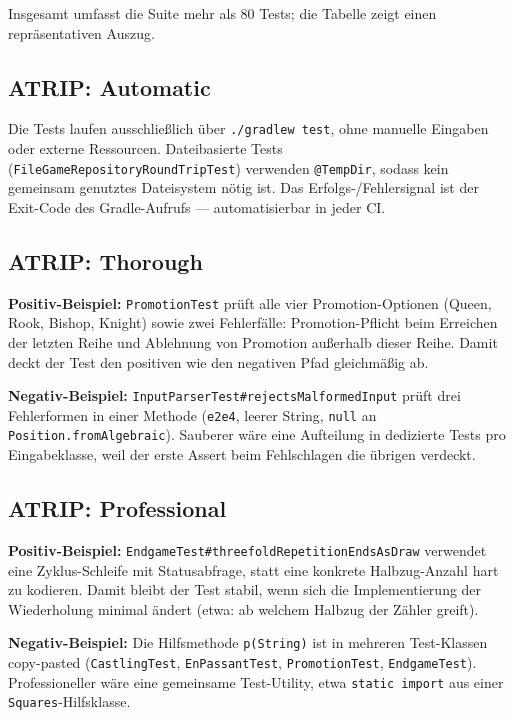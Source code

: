 \documentclass[a4paper,12pt]{article}
\begin{document}
Insgesamt umfasst die Suite mehr als 80 Tests; die Tabelle zeigt einen repräsentativen Auszug.

\bigskip

\subsection*{ATRIP: Automatic}

Die Tests laufen ausschließlich über \texttt{./gradlew test}, ohne manuelle Eingaben oder externe
Ressourcen. Dateibasierte Tests (\texttt{FileGameRepositoryRoundTripTest}) verwenden
\texttt{@TempDir}, sodass kein gemeinsam genutztes Dateisystem nötig ist. Das Erfolgs-/Fehlersignal
ist der Exit-Code des Gradle-Aufrufs --- automatisierbar in jeder CI.

\subsection*{ATRIP: Thorough}

\textbf{Positiv-Beispiel:} \texttt{PromotionTest} prüft alle vier Promotion-Optionen (Queen, Rook,
Bishop, Knight) sowie zwei Fehlerfälle: Promotion-Pflicht beim Erreichen der letzten Reihe und
Ablehnung von Promotion außerhalb dieser Reihe. Damit deckt der Test den positiven wie den
negativen Pfad gleichmäßig ab.

\textbf{Negativ-Beispiel:} \texttt{InputParserTest\#rejectsMalformedInput} prüft drei Fehlerformen
in einer Methode (\texttt{e2e4}, leerer String, \texttt{null} an \texttt{Position.fromAlgebraic}).
Sauberer wäre eine Aufteilung in dedizierte Tests pro Eingabeklasse, weil der erste Assert beim
Fehlschlagen die übrigen verdeckt.

\subsection*{ATRIP: Professional}

\textbf{Positiv-Beispiel:} \texttt{EndgameTest\#threefoldRepetitionEndsAsDraw} verwendet eine
Zyklus-Schleife mit Statusabfrage, statt eine konkrete Halbzug-Anzahl hart zu kodieren. Damit
bleibt der Test stabil, wenn sich die Implementierung der Wiederholung minimal ändert (etwa: ab
welchem Halbzug der Zähler greift).

\textbf{Negativ-Beispiel:} Die Hilfsmethode \texttt{p(String)} ist in mehreren Test-Klassen
copy-pasted (\texttt{CastlingTest}, \texttt{EnPassantTest}, \texttt{PromotionTest},
\texttt{EndgameTest}). Professioneller wäre eine gemeinsame Test-Utility, etwa \texttt{static
import} aus einer \texttt{Squares}-Hilfsklasse.
\end{document}
